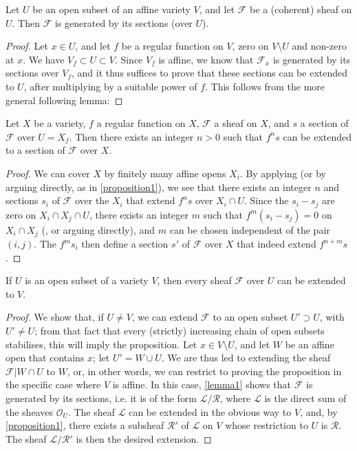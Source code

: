 \documentclass{article}
\theoremstyle{plain}
\newenvironment{proposition}[1]
    {\renewcommand\theinnercustomproposition{#1}\innercustomproposition}
    {\endinnercustomproposition}
\newenvironment{lemma}[1]
    {\renewcommand\theinnercustomlemma{#1}\innercustomlemma}
    {\endinnercustomlemma}
\theoremstyle{definition}
\newcommand{\sh}{\mathscr}
\newcommand{\oldpage}[1]{\marginpar{\footnotesize$\Big\vert$ \textit{p.~#1}}}
\begin{document}
\begin{lemma}{1}
\label{lemma1}
  Let $U$ be an open subset of an affine variety $V$, and let $\sh{F}$ be a (coherent) sheaf on $U$.
  Then $\sh{F}$ is generated by its sections (over $U$).
\end{lemma}

\begin{proof}
  Let $x\in U$, and let $f$ be a regular function on $V$, zero on $V\setminus U$ and non-zero at $x$.
  We have $V_f\subset U\subset V$.
  Since $V_f$ is affine, we know \cite{12} that $\sh{F}_x$ is generated by its sections over $V_f$, and it thus suffices to prove that these sections can be extended to $U$, after multiplying by a suitable power of $f$.
  This follows from the more general following lemma:
\end{proof}

\begin{lemma}{2}
\label{lemma2}
  Let $X$ be a variety, $f$ a regular function on $X$, $\sh{F}$ a sheaf on $X$, and $s$ a section of $\sh{F}$ over $U=X_f$.
  Then there exists an integer $n>0$ such that $f^ns$ can be extended to a section of $\sh{F}$ over $X$.
\end{lemma}

\begin{proof}
  We can cover $X$ by finitely many affine opens $X_i$.
  By applying \cite[lemma~1, p.~247]{12} (or by arguing directly, as in \cref{proposition1}), we see that there exists an integer $n$ and sections $s_i$ of $\sh{F}$ over the $X_i$ that extend $f^ns$ over $X_i\cap U$.
  Since the $s_i-s_j$ are zero on $X_i\cap X_j\cap U$, there exists an integer $m$ such that $f^m(s_i-s_j)=0$ on $X_i\cap X_j$ (\cite[p.~235]{12}, or arguing directly), and $m$ can be chosen independent of the pair $(i,j)$.
  The $f^ms_i$ then define a section $s'$ of $\sh{F}$ over $X$ that indeed extend $f^{n+m}s$.
\end{proof}

\begin{proposition}{2}
\label{proposition2}
\oldpage{99}
  If $U$ is an open subset of a variety $V$, then every sheaf $\sh{F}$ over $U$ can be extended to $V$.
\end{proposition}

\begin{proof}
  We show that, if $U\neq V$, we can extend $\sh{F}$ to an open subset $U'\supset U$, with $U'\neq U$;
  from that fact that every (strictly) increasing chain of open subsets stabilises, this will imply the proposition.
  Let $x\in V\setminus U$, and let $W$ be an affine open that contains $x$;
  let $U'=W\cup U$.
  We are thus led to extending the sheaf $\sh{F}|W\cap U$ to $W$, or, in other words, we can restrict to proving the proposition in the specific case where $V$ is affine.
  In this case, \cref{lemma1} shows that $\sh{F}$ is generated by its sections, i.e. it is of the form $\sh{L}/\sh{R}$, where $\sh{L}$ is the direct sum of the sheaves $\sh{O}_U$.
  The sheaf $\sh{L}$ can be extended in the obvious way to $V$, and, by \cref{proposition1}, there exists a subsheaf $\sh{R}'$ of $\sh{L}$ on $V$ whose restriction to $U$ is $\sh{R}$.
  The sheaf $\sh{L}/\sh{R}'$ is then the desired extension.
\end{proof}
\end{document}
